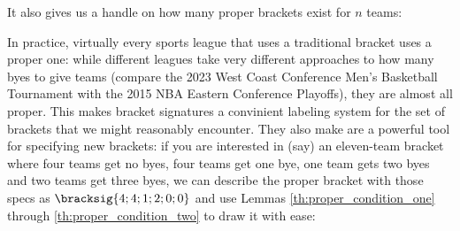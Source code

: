 {It also gives us a handle on how many proper brackets exist for $n$ teams:


In practice, virtually every sports league that uses a traditional bracket uses a proper one: while different leagues take very different approaches to how many byes to give teams (compare the 2023 West Coast Conference Men's Basketball Tournament with the 2015 NBA Eastern Conference Playoffs), they are almost all proper. This makes bracket signatures a convinient labeling system for the set of brackets that we might reasonably encounter. They also make are a powerful tool for specifying new brackets: if you are interested in (say) an eleven-team bracket where four teams get no byes, four teams get one bye, one team gets two byes and two teams get three byes, we can describe the proper bracket with those specs as $\bracksig{4; 4; 1; 2; 0; 0}$ and use Lemmas \ref{th:proper_condition_one} through \ref{th:proper_condition_two} to draw it with ease:

}